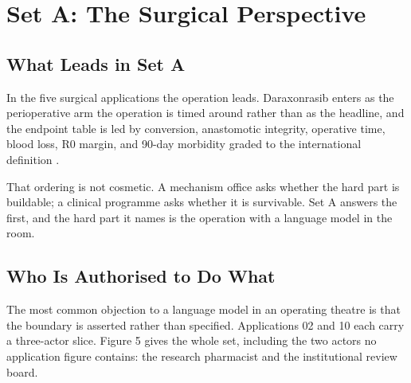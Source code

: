 \section{Set A: The Surgical Perspective}

\subsection{What Leads in Set A}

In the five surgical applications the operation leads. Daraxonrasib enters as
the perioperative arm the operation is timed around rather than as the headline,
and the endpoint table is led by conversion, anastomotic integrity, operative
time, blood loss, R0 margin, and 90-day morbidity graded to the international
definition \cite{bassi2017isgps}.

That ordering is not cosmetic. A mechanism office asks whether the hard part is
buildable; a clinical programme asks whether it is survivable. Set A answers the
first, and the hard part it names is the operation with a language model in the
room.

\subsection{Who Is Authorised to Do What}

The most common objection to a language model in an operating theatre is that
the boundary is asserted rather than specified. Applications 02 and 10 each
carry a three-actor slice. Figure 5 gives the whole set, including the two
actors no application figure contains: the research pharmacist and the
institutional review board.

